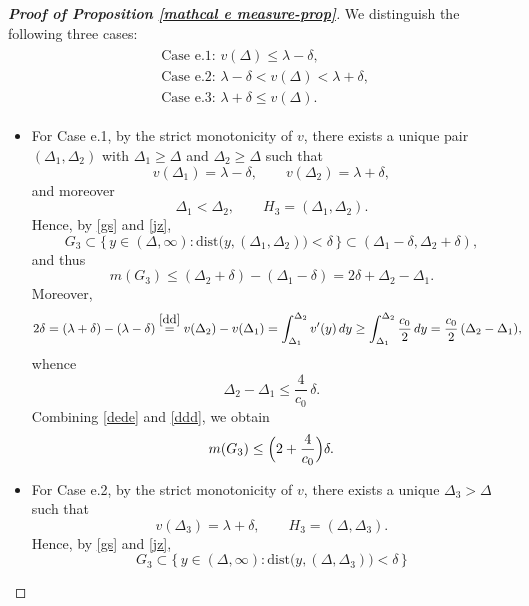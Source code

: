 \documentclass[10pt,a4paper]{amsart}
\begin{document}
{\begin{proof}[\bf Proof of Proposition \ref{mathcal e measure-prop}]
We distinguish the following three cases:
\begin{align}\label{sz}
\begin{split}
  &\text{Case e.1: } v(\Delta)\le \lambda-\delta,\\
  &\text{Case e.2: } \lambda-\delta< v(\Delta)< \lambda+\delta,\\
  &\text{Case e.3: } \lambda+\delta\le v(\Delta).
\end{split}
\end{align}

\begin{itemize}
    \item For Case e.1, by the strict monotonicity of $v$,
there exists a unique pair $(\Delta_1,\Delta_2)$ with $\Delta_1\ge \Delta$ and
$\Delta_2\ge \Delta$ such that
\begin{equation}\label{dd}
  v(\Delta_1)=\lambda-\delta,\qquad v(\Delta_2)=\lambda+\delta,
\end{equation}
and moreover
\begin{equation}\label{jz}
  \Delta_1<\Delta_2,\qquad H_3=(\Delta_1,\Delta_2).
\end{equation}
Hence, by \eqref{gs} and \eqref{jz},
\[
  G_3 \subset \{\,y\in(\Delta,\infty): \text{dist}\bigl(y,(\Delta_1,\Delta_2)\bigr)<\delta \,\}
      \subset (\Delta_1-\delta,\Delta_2+\delta),
\]
and thus
\begin{equation}\label{dede}
  m(G_3) \le (\Delta_2+\delta)-(\Delta_1-\delta) = 2\delta + \Delta_2-\Delta_1.
\end{equation}
Moreover,
\begin{align*}
  2\delta
  &= (\lambda+\delta)-(\lambda-\delta)
   \overset{\eqref{dd}}{=} v(\Delta_2)-v(\Delta_1)
   = \int_{\Delta_1}^{\Delta_2} v'(y)\,dy
   \ge \int_{\Delta_1}^{\Delta_2} \frac{c_0}{2}\,dy
   = \frac{c_0}{2}\,(\Delta_2-\Delta_1),
\end{align*}
whence
\begin{equation}\label{ddd}
  \Delta_2-\Delta_1 \le \frac{4}{c_0}\,\delta.
\end{equation}
Combining \eqref{dede} and \eqref{ddd}, we obtain
\begin{equation}\label{ggg}
  m(G_3) \le \Bigl(2+\frac{4}{c_0}\Bigr)\delta.
\end{equation}
\item For Case e.2, by the strict monotonicity of $v$,
there exists a unique $\Delta_3>\Delta$ such that
\[
  v(\Delta_3)=\lambda+\delta,
  \qquad H_3=(\Delta,\Delta_3).
\]
Hence, by \eqref{gs} and \eqref{jz},
\[
  G_3 \subset \{\,y\in(\Delta,\infty): \text{dist}\bigl(y,(\Delta,\Delta_3)\bigr)<\delta \,\}
\]
\end{itemize}
\end{proof}}
\end{document}
